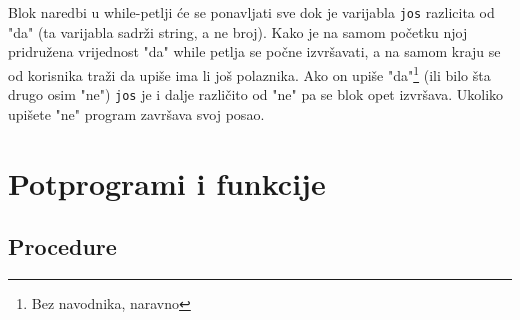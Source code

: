 
Blok naredbi u while-petlji \'{c}e se ponavljati sve dok je varijabla \verb"jos"
razlicita od "da" (ta varijabla sadr\v{z}i string, a ne broj). Kako je na samom
po\v{c}etku njoj pridru\v{z}ena vrijednost "da" while petlja se po\v{c}ne
izvr\v{s}avati, a na samom kraju se od korisnika tra\v{z}i da upi\v{s}e ima li
jo\v{s} polaznika. Ako on upi\v{s}e "da"\footnote{Bez navodnika,
naravno} (ili bilo \v{s}ta drugo osim "ne") \verb"jos"
je i dalje razli\v{c}ito od "ne" pa se blok opet izvr\v{s}ava. Ukoliko upi\v{s}ete
"ne" program zavr\v{s}ava svoj posao.

\section{Potprogrami i funkcije}

\subsection{Procedure}

